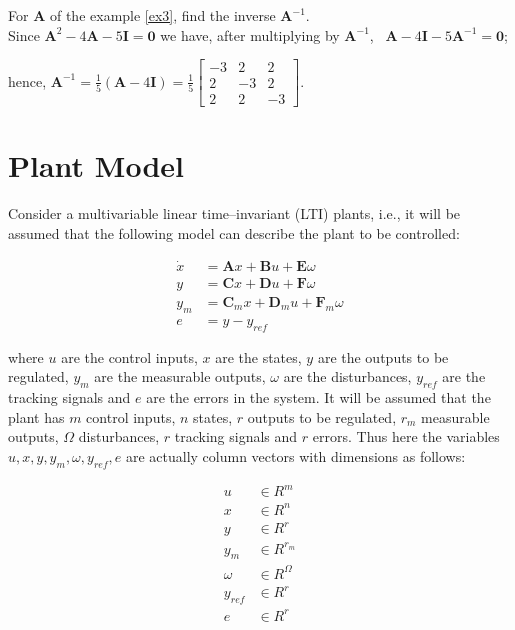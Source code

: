 \documentclass[a4paper,11pt]{article} %
\theoremstyle{plain} %
{\theorembodyfont{\normalfont}
\newtheorem{Exa}{Example}}
\newcommand{\matr}[1]{\mathbf{#1}}
\begin{document}
\begin{Exa}
For $\matr{A}$ of the example \ref{ex3}, find the inverse $\matr{A}^{-1}$. \\ %
Since $\matr{A}^2-4\matr{A}-5\matr{I} = \matr{0}$ we have, after multiplying by $\matr{A}^{-1}$, ~$\matr{A}-4\matr{I}-5\matr{A}^{-1} = \matr{0}$; %

\vspace{0.5\baselineskip}

hence, $\matr{A}^{-1}=\frac{1}{5} (\matr{A}-4\matr{I}) = \frac{1}{5} \left[
\begin{array}{rrr} -3 & 2 & 2 \\ 2 & -3 & 2 \\ 2 & 2 & -3
\end{array} \right]$.

\end{Exa}

\section{Plant Model}
Consider a multivariable linear time--invariant (LTI) plants, i.e.,
it will be assumed that the following model can describe the plant to be controlled: %

\begin{align}\label{pmodel}
  \dot{x} &= \matr{A} x + \matr{B} u + \matr{E} \omega \nonumber \\%
  y &= \matr{C} x + \matr{D} u + \matr{F} \omega \\ %
  y_m &= \matr{C}_m x + \matr{D}_m u + \matr{F}_m \omega \nonumber \\%
  e &= y - y_{ref} \nonumber
\end{align}

where $u$ are the control inputs, $x$ are the states, $y$ are the
outputs to be regulated, $y_m$ are the measurable outputs, $\omega$ are the disturbances, $y_{ref}$ are the tracking signals and $e$ are the errors in the system. It will be assumed that the plant has $m$ control inputs, $n$ states, $r$ outputs to be regulated, $r_m$ measurable outputs, $\Omega$ disturbances, $r$
tracking signals and $r$ errors. Thus here the variables $u, x, y, y_m, \omega, y_{ref}, e$ are actually column vectors with dimensions as follows:

\begin{align}
u &\in R^m \nonumber \\ %
x &\in R^n \nonumber \\%
y &\in R^r \nonumber \\ %
y_m &\in R^{r_m} \nonumber \\ %
\omega &\in R^{\Omega} \nonumber \\ %
y_{ref} &\in R^r \nonumber \\%
e &\in R^r \nonumber
\end{align}
\end{document}

